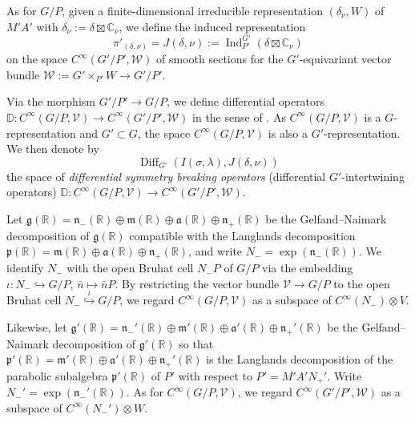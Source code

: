 \documentclass[a4paper,11pt,reqno]{amsart}
\newcommand{\fraka}{\mathfrak{a}}
\newcommand{\frakm}{\mathfrak{m}}
\newcommand{\frakn}{\mathfrak{n}}
\newcommand{\frakp}{\mathfrak{p}}
\newcommand{\CC}{\mathbb{C}}
\newcommand{\DD}{\mathbb{D}}
\newcommand{\0}{{\bf 0}}
\newcommand{\R}{\mathbb{R}}
\newcommand{\1}{{\bf 1}}
\DeclareMathOperator{\Ind}{Ind}
\DeclareMathOperator{\Diff}{Diff}
\theoremstyle{plain}
\theoremstyle{definition}
\numberwithin{equation}{section}
\theoremstyle{definition}
\begin{document}
As for $G/P$, given a finite-dimensional irreducible
representation $(\delta_\nu, W)$ of $M'A'$ with 
$\delta_\nu:=\delta \boxtimes \CC_{\nu}$,
we define
the induced representation 
\begin{equation*}
\pi'_{(\delta, \nu)}=J(\delta, \nu):=\Ind_{P'}^{G'}(\delta \boxtimes \CC_{\nu})
\end{equation*}
on the space $C^\infty(G'/P', \mathcal{W})$ of smooth sections for the 
$G'$-equivariant vector bundle $\mathcal{W}:=G'\times_{P'}W \to G'/P'$.

Via the morphism $G'/P' \to G/P$, we define 
differential operators $\DD\colon C^\infty(G/P, \mathcal{V}) \to C^\infty(G'/P', \mathcal{W})$
in the sense of \cite[Def.\ 2.1]{KoPe16a}.
As $C^\infty(G/P, \mathcal{V})$ is a $G$-representation and $G' \subset G$,
the space $C^\infty(G/P, \mathcal{V})$ is also a $G'$-representation.
We then denote by
\begin{equation*}
\Diff_{G'}(I(\sigma,\lambda),J(\delta,\nu))
\end{equation*}
the space of 
\emph{differential symmetry breaking operators} 
(differential $G'$-intertwining operators)
$\DD \colon C^\infty(G/P, \mathcal{V}) \to C^\infty(G'/P', \mathcal{W})$.

Let 
$\mathfrak{g}(\R)=\mathfrak{n}_-(\R) \oplus \mathfrak{m}(\R) 
\oplus \mathfrak{a}(\R) \oplus \mathfrak{n}_+(\R)$ 
be the Gelfand--Naimark decomposition of $\mathfrak{g}(\R)$
compatible with the Langlands decomposition
$\frakp(\R) = \frakm(\R) \oplus \fraka(\R) \oplus \frakn_+(\R)$,
and write $N_- = \exp(\frakn_-(\R))$. We identify $N_-$ with the 
open Bruhat cell $N_-P$ of $G/P$ via the embedding 
$\iota\colon N_- \hookrightarrow G/P$, $\bar{n} \mapsto \bar{n}P$.
By restricting the vector bundle $\mathcal{V} \to G/P$ to the open Bruhat cell
$N_-\stackrel{\iota}{\hookrightarrow} G/P$,
we regard $C^\infty(G/P,\mathcal{V})$ as a subspace of 
$C^\infty(N_-) \otimes V$.

Likewise,
let 
$\mathfrak{g}'(\R)=\mathfrak{n}_-'(\R) \oplus 
\mathfrak{m}'(\R) \oplus \mathfrak{a}'(\R) \oplus \mathfrak{n}_+'(\R)$ 
be the Gelfand--Naimark decomposition of $\mathfrak{g}'(\R)$
so that
$\mathfrak{p}'(\R) = \mathfrak{m}'(\R) \oplus \mathfrak{a}'(\R) \oplus 
\mathfrak{n}_+'(\R)$ is the Langlands decomposition of 
the parabolic subalgebra $\mathfrak{p}'(\R)$ of $P'$ with respect to $P'=M'A'N_+'$. 
Write $N_-' = \exp(\frakn_-'(\R))$.
As for $C^\infty(G/P,\mathcal{V})$, we regard $C^\infty(G'/P',\mathcal{W})$
as a subspace of $C^\infty(N_-')\otimes W$.
\end{document}
